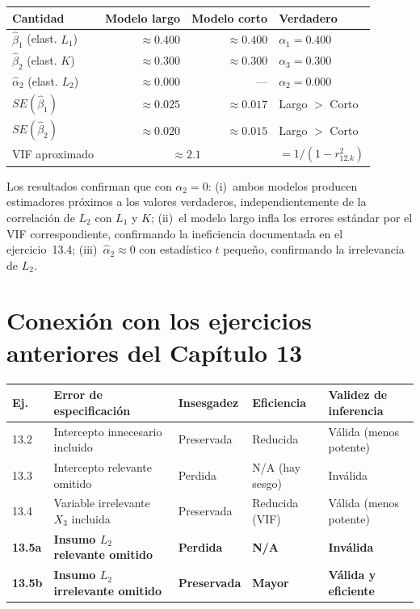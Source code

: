 \documentclass[12pt, letterpaper]{article}
\begin{document}
\begin{center}
\renewcommand{\arraystretch}{1.3}
\small
\begin{tabular}{lrrl}
\toprule
\textbf{Cantidad} & \textbf{Modelo largo} & \textbf{Modelo corto} & \textbf{Verdadero} \\
\midrule
$\hat{\beta}_1$ (elast. $L_1$) & $\approx 0.400$ & $\approx 0.400$ & $\alpha_1 = 0.400$ \\
$\hat{\beta}_2$ (elast. $K$)   & $\approx 0.300$ & $\approx 0.300$ & $\alpha_3 = 0.300$ \\
$\hat{\alpha}_2$ (elast. $L_2$) & $\approx 0.000$ & --- & $\alpha_2 = 0.000$ \\
\midrule
$SE(\hat{\beta}_1)$ & $\approx 0.025$ & $\approx 0.017$ & Largo $>$ Corto \\
$SE(\hat{\beta}_2)$ & $\approx 0.020$ & $\approx 0.015$ & Largo $>$ Corto \\
VIF aproximado       & \multicolumn{2}{c}{$\approx 2.1$} & $= 1/(1-r_{12.k}^2)$ \\
\bottomrule
\end{tabular}
\end{center}

Los resultados confirman que con $\alpha_2 = 0$: (i)~ambos modelos producen
estimadores próximos a los valores verdaderos, independientemente de la
correlación de $L_2$ con $L_1$ y $K$; (ii)~el modelo largo infla los errores
estándar por el VIF correspondiente, confirmando la ineficiencia documentada
en el ejercicio~13.4; (iii)~$\hat{\alpha}_2 \approx 0$ con estadístico $t$
pequeño, confirmando la irrelevancia de $L_2$.

\section{Conexión con los ejercicios anteriores del Capítulo 13}

\begin{center}
\renewcommand{\arraystretch}{1.4}
\small
\begin{tabular}{p{1.0cm}p{4.2cm}p{2.2cm}p{2.4cm}p{3.0cm}}
\toprule
\textbf{Ej.} & \textbf{Error de especificación} & \textbf{Insesgadez} &
\textbf{Eficiencia} & \textbf{Validez de inferencia} \\
\midrule
13.2 & Intercepto innecesario incluido     & Preservada   & Reducida           & Válida (menos potente) \\
13.3 & Intercepto relevante omitido        & Perdida      & N/A (hay sesgo)    & Inválida \\
13.4 & Variable irrelevante $X_3$ incluida & Preservada   & Reducida (VIF)     & Válida (menos potente) \\
\textbf{13.5a} & \textbf{Insumo $L_2$ relevante omitido}  & \textbf{Perdida} & \textbf{N/A}  & \textbf{Inválida} \\
\textbf{13.5b} & \textbf{Insumo $L_2$ irrelevante omitido} & \textbf{Preservada} & \textbf{Mayor} & \textbf{Válida y eficiente} \\
\bottomrule
\end{tabular}
\end{center}
\end{document}
